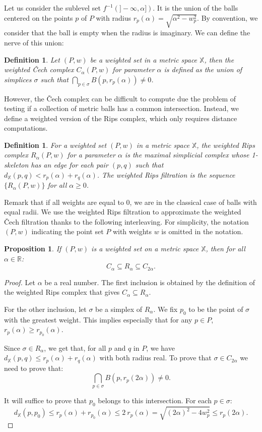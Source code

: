 \documentclass[a4paper]{article}
\newcommand\X{\mathbb{X}}
\newcommand\R{\mathbb{R}}
\newcommand\dX[2]{d_\X(#1,#2)}
\newtheorem{definition}[theorem]{Definition}
\newtheorem{proposition}[theorem]{Proposition}
\begin{document}
Let us consider the sublevel set $f^{-1}(]-\infty,\alpha])$.
It is the union of the balls centered on the points $p$ of $P$ with radius $r_p(\alpha)=\sqrt{\alpha^2-w_p^2}$.
By convention, we consider that the ball is empty when the radius is imaginary.
We can define the nerve of this union:

\begin{definition}
Let $(P,w)$ be a weighted set in a metric space $\X$, then the \emph{weighted \v Cech complex} $C_\alpha(P,w)$ for parameter $\alpha$ is defined as the union of simplices $\sigma$ such that $\bigcap_{p\in\sigma}B(p,r_p(\alpha))\neq0$.
\end{definition}

  However, the \v Cech complex can be difficult to compute due the problem of testing if a collection of metric balls has a common intersection.
  Instead, we define a weighted version of the Rips complex, which only requires distance computations.

  \begin{definition}
  For a weighted set $(P,w)$ in a metric space $\X$, the \emph{weighted Rips complex} $R_\alpha(P,w)$ for a parameter $\alpha$ is the maximal simplicial complex whose 1-skeleton has an edge for each pair $(p,q)$ such that $\dX{p}{q} < r_p(\alpha) + r_q(\alpha)$.
  The \emph{weighted Rips filtration} is the sequence $\{R_\alpha(P,w)\}$ for all $\alpha\ge 0$.
  \end{definition}

Remark that if all weights are equal to $0$, we are in the classical case of balls with equal radii.
We use the weighted Rips filtration to approximate the weighted \v{C}ech filtration thanks to the following interleaving.
For simplicity, the notation $(P,w)$ indicating the point set $P$ with weights $w$ is omitted in the notation.

\begin{proposition}
If $(P,w)$ is a weighted set on a metric space $\X$, then for all $\alpha\in\R$:
$$C_\alpha\subseteq R_\alpha\subseteq C_{2\alpha}.$$
\end{proposition}

\begin{proof}
Let $\alpha$ be a real number.
The first inclusion is obtained by the definition of the weighted Rips complex that gives $C_\alpha\subseteq R_\alpha$.

For the other inclusion, let $\sigma$ be a simplex of $R_\alpha$.
We fix $p_0$ to be the point of $\sigma$ with the greatest weight. 
This implies especially that for any $p\in P$, $r_p(\alpha)\geq r_{p_0}(\alpha)$.

Since $\sigma\in R_\alpha$, we get that, for all $p$ and $q$ in $P$, we have $\dX{p}{q}\leq r_{p}(\alpha)+r_{q}(\alpha)$ with both radius real.
To prove that $\sigma\in C_{2\alpha}$ we need to prove that:
$$\bigcap_{p\in\sigma}B(p,r_{p}(2\alpha))\neq 0.$$

It will suffice to prove that $p_0$ belongs to this intersection.
For each $p\in\sigma$:
$$\dX{p}{p_0}\leq r_{p}(\alpha)+r_{p_0}(\alpha)\leq 2\ r_{p}(\alpha)= \sqrt{(2\alpha)^2-4w_{p}^2}\leq r_{p}(2\alpha).$$
\end{proof}
\end{document}

